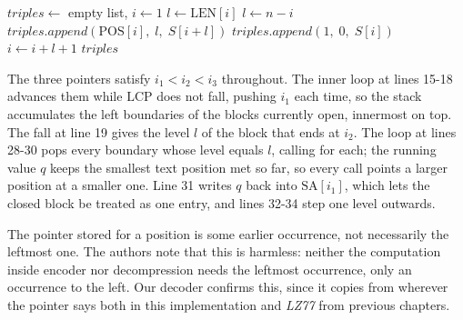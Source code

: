 \begin{algorithm}[H]
\caption{\emph{CPS1a}: continuation}
\label{alg:cps-scan-cont}
\begin{algorithmic}[1]
  \State $triples \gets$ empty list, \quad $i \gets 1$
    \State $l \gets \mathrm{LEN}[i]$
      \State $l \gets n - i$
    \EndIf
      \State $triples.append(\mathrm{POS}[i],\; l,\; S[i + l])$
    \Else
      \State $triples.append(1,\; 0,\; S[i])$
    \EndIf
    \State $i \gets i + l + 1$
  \EndWhile
  \State \Return $triples$
\EndFunction
\end{algorithmic}
\end{algorithm}

The three pointers satisfy \(i_1 < i_2 < i_3\) throughout. The inner loop at lines 15-18 advances them while \(\mathrm{LCP}\) does not fall, pushing \(i_1\) each time, so the stack accumulates the left boundaries of the blocks currently open, innermost on top. The fall at line 19 gives the level \(l\) of the block that ends at \(i_2\). The loop at lines 28-30 pops every boundary whose level equals \(l\), calling  for each; the running value \(q\) keeps the smallest text position met so far, so every call points a larger position at a smaller one. Line 31 writes \(q\) back into \(\mathrm{SA}[i_1]\), which lets the closed block be treated as one entry, and lines 32-34 step one level outwards.

The pointer stored for a position is some earlier occurrence, not necessarily the leftmost one. The authors note that this is harmless: neither the computation inside encoder nor decompression needs the leftmost occurrence, only an occurrence to the left. Our decoder confirms this, since it copies from wherever the pointer says both in this implementation and \emph{LZ77} from previous chapters.

